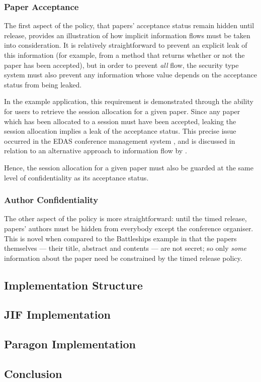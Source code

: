 \subsubsection{Paper Acceptance}

The first aspect of the policy, that papers' acceptance status remain hidden until release, provides an illustration of how implicit information flows must be taken into consideration. It is relatively straightforward to prevent an explicit leak of this information (for example, from a method that returns whether or not the paper has been accepted), but in order to prevent \textit{all} flow, the security type system must also prevent any information whose value depends on the acceptance status from being leaked.

In the example application, this requirement is demonstrated through the ability for users to retrieve the session allocation for a given paper. Since any paper which has been allocated to a session must have been accepted, leaking the session allocation implies a leak of the acceptance status. This precise issue occurred in the EDAS conference management system \cite{agrawal2016edas_conf}, and is discussed in relation to an alternative approach to information flow by \citeauthor{polikarpova2016lifty} \cite{polikarpova2016lifty}.

Hence, the session allocation for a given paper must also be guarded at the same level of confidentiality as its acceptance status.

\subsubsection{Author Confidentiality}

The other aspect of the policy is more straightforward: until the timed release, papers' authors must be hidden from everybody except the conference organiser. This is novel when compared to the Battleships example in that the papers themselves --- their title, abstract and contents --- are not secret; so only \textit{some} information about the paper need be constrained by the timed release policy.

\subsection{Implementation Structure}

\subsection{JIF Implementation}

\subsection{Paragon Implementation}

\subsection{Conclusion}